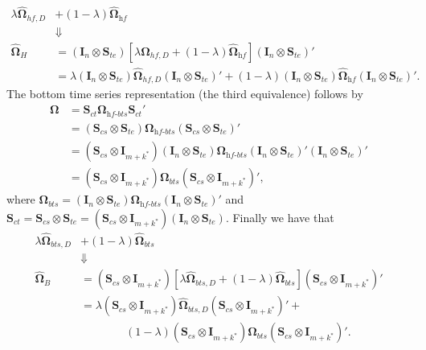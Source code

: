\documentclass[a4paper,11pt]{article}
\newcommand{\Ivet}{\bm{I}}
\newcommand{\Svet}{\bm{S}}
\newcommand{\Omegavet}{\bm{\Omega}}
\theoremstyle{definition}
\begin{document}
\begin{align*}
	\lambda \widehat{\Omegavet}_{hf, D} &+ (1-\lambda) \widehat{\Omegavet}_{\textit{hf}}\\
	&\Downarrow\\
	\widehat{\Omegavet}_{H} & = (\Ivet_{n} \otimes \Svet_{te})\left[\lambda \widehat{\Omegavet}_{hf, D} + (1-\lambda) \widehat{\Omegavet}_{\textit{hf}}\right] (\Ivet_{n} \otimes \Svet_{te})'                                                                                                            \\
	                        & = \lambda (\Ivet_{n} \otimes \Svet_{te})\widehat{\Omegavet}_{hf, D}(\Ivet_{n} \otimes \Svet_{te})' + (1-\lambda) (\Ivet_{n} \otimes \Svet_{te})\widehat{\Omegavet}_{\textit{hf}}(\Ivet_{n} \otimes \Svet_{te})'.
\end{align*}
The bottom time series representation (the third equivalence) follows by
\begin{align*}
	\Omegavet & = \Svet_{ct}\Omegavet_{\textit{hf-bts}}\Svet_{ct}'                                                                                                                                                   \\
	          & = \left(\Svet_{cs} \otimes \Svet_{te}\right)\Omegavet_{\textit{hf-bts}}\left(\Svet_{cs} \otimes \Svet_{te}\right)'                                                                                   \\
	          & = \left(\Svet_{cs} \otimes \Ivet_{m+k^\ast}\right)\left(\Ivet_n \otimes \Svet_{te}\right)\Omegavet_{\textit{hf-bts}}\left(\Ivet_n \otimes \Svet_{te}\right)'\left(\Ivet_n \otimes \Svet_{te}\right)' \\
	          & = \left(\Svet_{cs} \otimes \Ivet_{m+k^\ast}\right)\Omegavet_{bts}\left(\Svet_{cs} \otimes \Ivet_{m+k^\ast}\right)',
\end{align*}
where $\Omegavet_{bts} = \left(\Ivet_n \otimes \Svet_{te}\right)\Omegavet_{\textit{hf-bts}}\left(\Ivet_n \otimes \Svet_{te}\right)'$ and $\Svet_{ct} = \Svet_{cs} \otimes \Svet_{te} = \left(\Svet_{cs} \otimes \Ivet_{m+k^\ast}\right)\left(\Ivet_n \otimes \Svet_{te}\right)$. Finally we have that
\begin{align*}
	\lambda \widehat{\Omegavet}_{bts, D} &+ (1-\lambda) \widehat{\Omegavet}_{bts}\\
	&\Downarrow\\
	\widehat{\Omegavet}_{B} & = \left(\Svet_{cs} \otimes \Ivet_{m+k^\ast}\right)\left[\lambda \widehat{\Omegavet}_{bts, D} + (1-\lambda) \widehat{\Omegavet}_{bts}\right]\left(\Svet_{cs} \otimes \Ivet_{m+k^\ast}\right)'                       \\
	                        & = \lambda \left(\Svet_{cs} \otimes \Ivet_{m+k^\ast}\right)\widehat{\Omegavet}_{bts, D}\left(\Svet_{cs} \otimes \Ivet_{m+k^\ast}\right)' +             \\
	                        & \qquad \qquad (1-\lambda) \left(\Svet_{cs} \otimes \Ivet_{m+k^\ast}\right)\widehat{\Omegavet}_{bts}\left(\Svet_{cs} \otimes \Ivet_{m+k^\ast}\right)'.
\end{align*}
\end{document}
